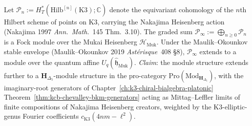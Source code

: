 \begin{theorem}
\label{thm:modtr-plancherel-hs-convergence}
Let $\mathcal P_n := H^*_T(\mathrm{Hilb}^{[n]}(\mathrm K3);\mathbb C)$
denote the equivariant cohomology of the $n$th Hilbert scheme of
points on $\mathrm K3$, carrying the Nakajima Heisenberg action
(Nakajima 1997 \emph{Ann.\ Math.}~145 Thm.~3.10). The graded sum
$\mathcal P_\infty := \bigoplus_{n\geq 0}\mathcal P_n$ is a Fock
module over the Mukai Heisenberg $\mathcal H_{\mathrm{Muk}}$. Under
the Maulik--Okounkov stable envelope
(Maulik--Okounkov 2019 \emph{Ast\'erisque}~408 \S8), $\mathcal P_\infty$
extends to a module over the quantum affine $U_q(\widehat{\mathfrak h}_{\mathrm{Muk}})$.
\emph{Claim}: the module structure extends further to a
$\mathbf H_{\Delta_5}$-module structure in the pro-category
$\mathrm{Pro}(\mathrm{Mod}_{\mathbf H_{\Delta_5}})$, with the
imaginary-root generators of
Chapter~\ref{ch:k3-chiral-bialgebra-platonic}
Theorem~\ref{thm:kcb-chevalley-bkm-generators} acting as
Mittag--Leffler limits of finite compositions of Nakajima Heisenberg
creators, weighted by the K3-elliptic-genus Fourier coefficients
$c_{\mathrm{K3}}(4nm-\ell^2)$.
\end{theorem}

